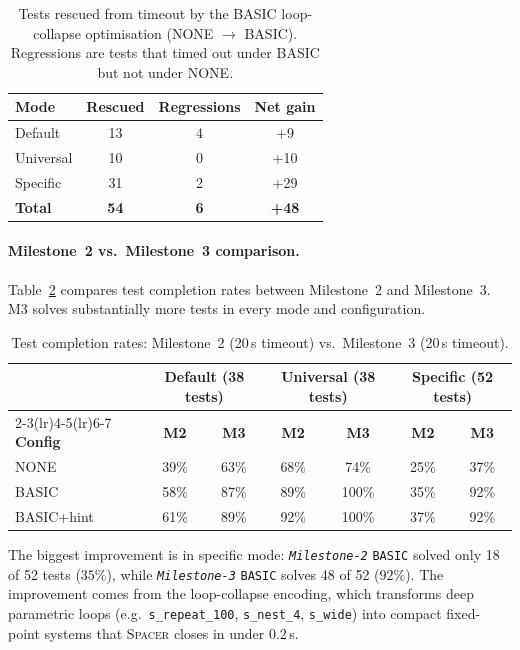 \begin{table}[H]
\centering
\caption{Tests rescued from timeout by the BASIC loop-collapse optimisation
(NONE $\to$ BASIC).  Regressions are tests that timed out under BASIC but not under NONE.}
\label{tab:basic-gain-m3}
\begin{tabular}{lccc}
\toprule
\textbf{Mode} & \textbf{Rescued} & \textbf{Regressions} & \textbf{Net gain} \\
\midrule
Default   & 13 & 4 & +9 \\
Universal & 10 & 0 & +10 \\
Specific  & 31 & 2 & +29 \\
\midrule
\textbf{Total} & \textbf{54} & \textbf{6} & \textbf{+48} \\
\bottomrule
\end{tabular}
\end{table}

\paragraph{Milestone~2 vs.\ Milestone~3 comparison.}
Table~\ref{tab:m2-m3-compare} compares test completion rates between Milestone~2
and Milestone~3.  M3 solves substantially more tests in every mode and configuration.

\begin{table}[H]
\centering
\caption{Test completion rates: Milestone~2 (20\,s timeout) vs.\ Milestone~3 (20\,s timeout).}
\label{tab:m2-m3-compare}
\begin{tabular}{lcccccc}
\toprule
& \multicolumn{2}{c}{\textbf{Default (38 tests)}}
& \multicolumn{2}{c}{\textbf{Universal (38 tests)}}
& \multicolumn{2}{c}{\textbf{Specific (52 tests)}} \\
\cmidrule(lr){2-3}\cmidrule(lr){4-5}\cmidrule(lr){6-7}
\textbf{Config} & \textbf{M2} & \textbf{M3} & \textbf{M2} & \textbf{M3} & \textbf{M2} & \textbf{M3} \\
\midrule
NONE       & 39\% & 63\% & 68\% &  74\% & 25\% & 37\% \\
BASIC      & 58\% & 87\% & 89\% & 100\% & 35\% & 92\% \\
BASIC+hint & 61\% & 89\% & 92\% & 100\% & 37\% & 92\% \\
\bottomrule
\end{tabular}
\end{table}

The biggest improvement is in specific mode: \textit{\texttt{Milestone-2}} \texttt{BASIC} solved only 18 of 52 tests
($35\%$), while \textit{\texttt{Milestone-3}} \texttt{BASIC} solves 48 of 52 ($92\%$).
The improvement comes from the loop-collapse encoding,
which transforms deep parametric loops (e.g.\ \texttt{s\_repeat\_100},
\texttt{s\_nest\_4}, \texttt{s\_wide}) into compact fixed-point systems that
\textsc{Spacer} closes in under $0.2$\,s.


